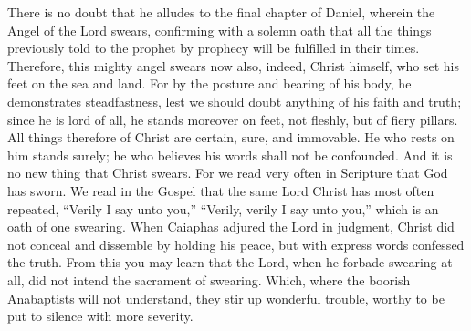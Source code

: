 There is no doubt that he alludes to the final chapter of Daniel, wherein the Angel of the Lord swears, confirming with a solemn oath that all the things previously told to the prophet by prophecy will be fulfilled in their times. Therefore, this mighty angel swears now also, indeed, Christ himself, who set his feet on the sea and land. For by the posture and bearing of his body, he demonstrates steadfastness, lest we should doubt anything of his faith and truth; since he is lord of all, he stands moreover on feet, not fleshly, but of fiery pillars. All things therefore of Christ are certain, sure, and immovable. He who rests on him stands surely; he who believes his words shall not be confounded. And it is no new thing that Christ swears. For we read very often in Scripture that God has sworn. We read in the Gospel that the same Lord Christ has most often repeated, “Verily I say unto you,” “Verily, verily I say unto you,” which is an oath of one swearing. When Caiaphas adjured the Lord in judgment, Christ did not conceal and dissemble by holding his peace, but with express words confessed the truth. From this you may learn that the Lord, when he forbade swearing at all, did not intend the sacrament of swearing. Which, where the boorish Anabaptists will not understand, they stir up wonderful trouble, worthy to be put to silence with more severity.

